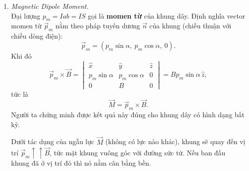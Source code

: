 \begin{enumerate}
\begin{figure}[htbp]
\end{figure}
Chọn hệ trục với $\vec{B} = (0, B, 0)$ và cạnh $MN$, $PQ$ song song $Oz$. Khi đó $\vec{MN} = (0,0,-a)$, $\vec{PQ} = (0,0,a)$ và
\[
\vec{F}_1 = I\,\vec{MN} \times \vec{B} =
\begin{vmatrix}
\hat{x} & \hat{y} & \hat{z}\\
0 & 0 & -aI\\
0 & B & 0
\end{vmatrix}
= IaB\,\hat{x},
\qquad
\vec{F}_2 = I\,\vec{PQ} \times \vec{B} = -IaB\,\hat{x}.
\]
Gọi $\alpha$ là góc giữa $Ox$ và mặt khung. Điểm đặt của hai lực là
\[
A\left(\tfrac{b}{2}\cos\alpha,\ -\tfrac{b}{2}\sin\alpha,\ 0\right),
\qquad
B\left(-\tfrac{b}{2}\cos\alpha,\ \tfrac{b}{2}\sin\alpha,\ 0\right).
\]
Hai lực $\vec{F}_1$, $\vec{F}_2$ tạo thành một ngẫu lực có momen
\begin{align*}
\vec{M} &= \vec{OA} \times \vec{F}_1 + \vec{OB} \times \vec{F}_2\\
&= \left(0,0,\tfrac{IaBb}{2}\sin\alpha\right) + \left(0,0,\tfrac{IaBb}{2}\sin\alpha\right)
= (0,\ 0,\ IabB\sin\alpha).
\end{align*}

\item \textit{Magnetic Dipole Moment.}\\
Đại lượng $p_m = Iab = IS$ gọi là \textbf{momen từ} của khung dây. Định nghĩa vector momen từ $\vec{p}_m$ nằm theo pháp tuyến dương $\vec{n}$ của khung (chiều thuận với chiều dòng điện):
\[
\vec{p}_m = (p_m\sin\alpha,\ p_m\cos\alpha,\ 0).
\]
Khi đó
\[
\vec{p}_m \times \vec{B} =
\begin{vmatrix}
\hat{x} & \hat{y} & \hat{z}\\
p_m\sin\alpha & p_m\cos\alpha & 0\\
0 & B & 0
\end{vmatrix}
= B p_m\sin\alpha\,\hat{z},
\]
tức là
\[
\boxed{\vec{M} = \vec{p}_m \times \vec{B}}.
\]
Người ta chứng minh được kết quả này đúng cho khung dây có hình dạng bất kỳ.
\begin{remark}
Dưới tác dụng của ngẫu lực $\vec{M}$ (không có lực nào khác), khung sẽ quay đến vị trí $\vec{p}_m \uparrow\uparrow \vec{B}$, tức mặt khung vuông góc với đường sức từ. Nếu ban đầu khung đã ở vị trí đó thì nó nằm cân bằng bền.
\end{remark}
\end{enumerate}

